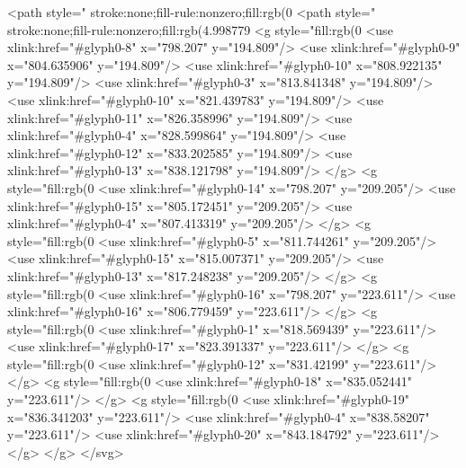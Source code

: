 <path style=" stroke:none;fill-rule:nonzero;fill:rgb(0%
<path style=" stroke:none;fill-rule:nonzero;fill:rgb(4.998779%
<g style="fill:rgb(0%
  <use xlink:href="#glyph0-8" x="798.207" y="194.809"/>
  <use xlink:href="#glyph0-9" x="804.635906" y="194.809"/>
  <use xlink:href="#glyph0-10" x="808.922135" y="194.809"/>
  <use xlink:href="#glyph0-3" x="813.841348" y="194.809"/>
  <use xlink:href="#glyph0-10" x="821.439783" y="194.809"/>
  <use xlink:href="#glyph0-11" x="826.358996" y="194.809"/>
  <use xlink:href="#glyph0-4" x="828.599864" y="194.809"/>
  <use xlink:href="#glyph0-12" x="833.202585" y="194.809"/>
  <use xlink:href="#glyph0-13" x="838.121798" y="194.809"/>
</g>
<g style="fill:rgb(0%
  <use xlink:href="#glyph0-14" x="798.207" y="209.205"/>
  <use xlink:href="#glyph0-15" x="805.172451" y="209.205"/>
  <use xlink:href="#glyph0-4" x="807.413319" y="209.205"/>
</g>
<g style="fill:rgb(0%
  <use xlink:href="#glyph0-5" x="811.744261" y="209.205"/>
  <use xlink:href="#glyph0-15" x="815.007371" y="209.205"/>
  <use xlink:href="#glyph0-13" x="817.248238" y="209.205"/>
</g>
<g style="fill:rgb(0%
  <use xlink:href="#glyph0-16" x="798.207" y="223.611"/>
  <use xlink:href="#glyph0-16" x="806.779459" y="223.611"/>
</g>
<g style="fill:rgb(0%
  <use xlink:href="#glyph0-1" x="818.569439" y="223.611"/>
  <use xlink:href="#glyph0-17" x="823.391337" y="223.611"/>
</g>
<g style="fill:rgb(0%
  <use xlink:href="#glyph0-12" x="831.42199" y="223.611"/>
</g>
<g style="fill:rgb(0%
  <use xlink:href="#glyph0-18" x="835.052441" y="223.611"/>
</g>
<g style="fill:rgb(0%
  <use xlink:href="#glyph0-19" x="836.341203" y="223.611"/>
  <use xlink:href="#glyph0-4" x="838.58207" y="223.611"/>
  <use xlink:href="#glyph0-20" x="843.184792" y="223.611"/>
</g>
</g>
</svg>
